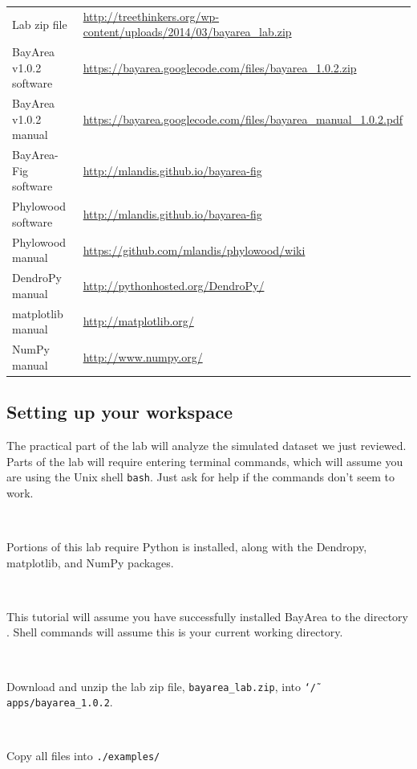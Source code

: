 \documentclass[11pt]{article}
\newcommand{\impmark}{\strut\vadjust{\domark}}
\newcommand{\domark}{%
  \vbox to 0pt{
    \kern-\dp\strutbox
    \smash{\llap{$\rightarrow$\kern1em}}
    \vss
  }%
}
\begin{document}
\begin{tabular}{ll}
Lab zip file & \url{http://treethinkers.org/wp-content/uploads/2014/03/bayarea_lab.zip} \\
BayArea v1.0.2 software & \url{https://bayarea.googlecode.com/files/bayarea_1.0.2.zip} \\
BayArea v1.0.2 manual & \url{https://bayarea.googlecode.com/files/bayarea_manual_1.0.2.pdf} \\
BayArea-Fig software & \url{http://mlandis.github.io/bayarea-fig} \\
Phylowood software & \url{http://mlandis.github.io/bayarea-fig} \\
Phylowood manual & \url{https://github.com/mlandis/phylowood/wiki} \\
DendroPy manual & \url{http://pythonhosted.org/DendroPy/} \\
matplotlib manual & \url{http://matplotlib.org/} \\
NumPy manual & \url{http://www.numpy.org/}

\end{tabular}

\subsection{Setting up your workspace}

The practical part of the lab will analyze the simulated dataset we just reviewed.
Parts of the lab will require entering terminal commands, which will assume you are using the Unix shell \texttt{bash}.
Just ask for help if the commands don't seem to work.

\noindent \\ \impmark Portions of this lab require Python is installed, along with the Dendropy, matplotlib, and NumPy packages.

\noindent \\ \impmark This tutorial will assume you have successfully installed BayArea to the directory . Shell commands will assume this is your current working directory.

\noindent \\ \impmark Download and unzip the lab zip file, \texttt{bayarea\_lab.zip}, into \texttt{\char`\~/apps/bayarea\_1.0.2}.

\noindent \\ \impmark Copy all files into \texttt{./examples/}
\end{document}
